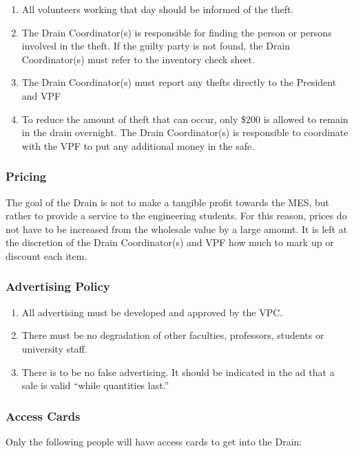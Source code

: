 \begin{enumerate}
 \item
  All volunteers working that day should be informed of the theft.
 \item
  The Drain Coordinator(s) is responsible for finding the person or persons involved in the theft. If the guilty party is not found, the Drain Coordinator(s) must refer to the inventory check sheet.
 \item
  The Drain Coordinator(s) must report any thefts directly to the President and VPF
 \item
  To reduce the amount of theft that can occur, only \$200 is allowed to remain in the drain overnight. The Drain Coordinator(s) is responsible to coordinate with the VPF to put any additional money in the safe.
\end{enumerate}

\subsubsection{Pricing}
\label{pricing}
The goal of the Drain is not to make a tangible profit towards the MES,
but rather to provide a service to the engineering students. For this
reason, prices do not have to be increased from the wholesale value by a
large amount. It is left at the discretion of the Drain Coordinator(s)
and VPF how much to mark up or discount each item.

\subsubsection{Advertising Policy}
\label{advertising-policy}
\begin{enumerate}
 \item
  All advertising must be developed and approved by the VPC.
 \item
  There must be no degradation of other faculties, professors, students or university staff.
 \item
  There is to be no false advertising. It should be indicated in the ad that a sale is valid ``while quantities last.''

\end{enumerate}

\subsubsection{Access Cards}
\label{access-cards}
Only the following people will have access cards to get into the Drain:

